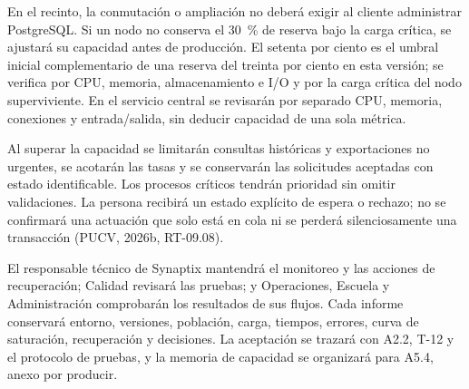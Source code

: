 En el recinto, la conmutación o ampliación no deberá exigir al cliente administrar PostgreSQL. Si un nodo no conserva el 30~\% de reserva bajo la carga crítica, se ajustará su capacidad antes de producción. El setenta por ciento es el umbral inicial complementario de una reserva del treinta por ciento en esta versión; se verifica por CPU, memoria, almacenamiento e I/O y por la carga crítica del nodo superviviente. En el servicio central se revisarán por separado CPU, memoria, conexiones y entrada/salida, sin deducir capacidad de una sola métrica.

Al superar la capacidad se limitarán consultas históricas y exportaciones no urgentes, se acotarán las tasas y se conservarán las solicitudes aceptadas con estado identificable. Los procesos críticos tendrán prioridad sin omitir validaciones. La persona recibirá un estado explícito de espera o rechazo; no se confirmará una actuación que solo está en cola ni se perderá silenciosamente una transacción (PUCV, 2026b, RT-09.08).

El responsable técnico de Synaptix mantendrá el monitoreo y las acciones de recuperación; Calidad revisará las pruebas; y Operaciones, Escuela y Administración comprobarán los resultados de sus flujos. Cada informe conservará entorno, versiones, población, carga, tiempos, errores, curva de saturación, recuperación y decisiones. La aceptación se trazará con A2.2, T-12 y el protocolo de pruebas, y la memoria de capacidad se organizará para A5.4, anexo por producir.

